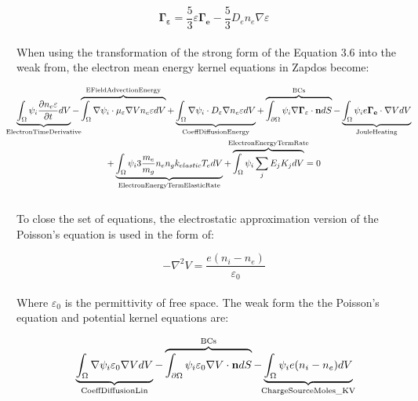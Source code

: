 \documentclass[final]{report}
\begin{document}
  \begin{equation}
      \mathbf{\Gamma_{\varepsilon}}=\frac{5}{3}\varepsilon\mathbf{\Gamma_{e}}-\frac{5}{3}D_{e}n_{e}\nabla\varepsilon
  \end{equation}
  \\
  When using the transformation of the strong form of the Equation 3.6 into the weak from, the electron mean energy kernel equations in Zapdos become:

  \begin{equation}
  \begin{gathered}
    \underbrace{\int_{\Omega}\psi_{i}\frac{\partial n_{e}\varepsilon}{\partial t} dV}_\text{\makebox[0pt]{ElectronTimeDerivative}}- \overbrace{\int_{\Omega}\nabla\psi_{i}\cdot\mu_{\varepsilon}\nabla V n_{e}\varepsilon dV}^\text{\makebox[0pt]{EFieldAdvectionEnergy}}+\underbrace{\int_{\Omega}\nabla\psi_{i}\cdot D_{\varepsilon}\nabla n_{e}\varepsilon dV}_\text{\makebox[0pt]{CoeffDiffusionEnergy}}+\overbrace{\int_{\partial\Omega}\psi_{i}\nabla \mathbf{\Gamma_{\varepsilon}}\cdot \mathbf{n} dS}^\text{\makebox[0pt]{BCs}}-\underbrace{\int_{\Omega}\psi_{i}e\mathbf{\Gamma_{e}}\cdot\nabla V  dV}_\text{\makebox[0pt]{JouleHeating}} \\
    +\underbrace{\int_{\Omega}\psi_{i}3\frac{m_{e}}{m_{g}}n_{e}n_{g}k_{elastic}T_{e}  dV}_\text{\makebox[0pt]{ElectronEnergyTermElasticRate}}+\overbrace{\int_{\Omega}\psi_{i}\sum_{j}{E_jK_j}  dV}^\text{\makebox[0pt]{ElectronEnergyTermRate}}=0
  \end{gathered}
  \end{equation}
  \\
  To close the set of equations, the electrostatic approximation version of the Poisson's equation is used in the form of:

  \begin{equation}
      -\nabla^{2}V=\frac{e(n_{i}-n_{e})}{\varepsilon_{0}}
  \end{equation}
  \\
  Where $\varepsilon_{0}$ is the permittivity of free space. The weak form the the Poisson's equation and potential kernel equations are:

  \begin{equation}
     \underbrace{\int_{\Omega}\nabla\psi_{i}\varepsilon_{0}\nabla V dV}_\text{\makebox[0pt]{CoeffDiffusionLin}}-\overbrace{\int_{\partial\Omega}\psi_{i}\varepsilon_{0}\nabla V\cdot \mathbf{n} dS}^\text{\makebox[0pt]{BCs}}-\underbrace{\int_{\Omega}\psi_{i}e(n_{i}-n_{e}) dV}_\text{\makebox[0pt]{ChargeSourceMoles\_KV}}
  \end{equation}
\end{document}
